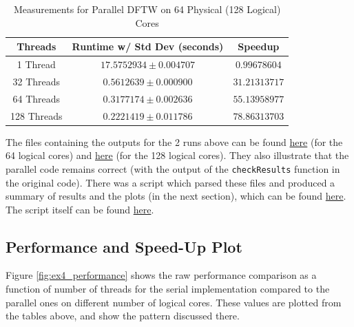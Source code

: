 \documentclass[a4paper,10pt]{article}
\begin{document}
\begin{table}[h!]
\centering
\begin{tabular}{|c|c|c|}
\hline
\textbf{Threads} & \textbf{Runtime w/ Std Dev (seconds)} & \textbf{Speedup} \\
\hline
1 Thread  & $17.5752934 \pm 0.004707$  & $0.99678604$ \\
32 Threads & $0.5612639 \pm 0.000900$ & $31.21313717$ \\
64 Threads & $0.3177174 \pm 0.002636$ & $55.13958977$ \\
128 Threads & $0.2221419 \pm 0.011786$ & $78.86313703$ \\
\hline
\end{tabular}
\caption{Measurements for Parallel DFTW on 64 Physical (128 Logical) Cores}
\label{table:ex4_128_cores}
\end{table}

The files containing the outputs for the 2 runs above can be found \href{https://github.com/paulmyr/DD2356-MethodsHPC/blob/master/3_open_mp/exercise4/outputs/dftw_omp_output_64.txt}{here} (for the 64 logical cores) and \href{https://github.com/paulmyr/DD2356-MethodsHPC/blob/master/3_open_mp/exercise4/outputs/dftw_omp_output_128.txt}{here} (for the 128 logical cores). They also illustrate that the parallel code remains correct (with the output of the \verb|checkResults| function in the original code). There was a script which parsed these files and produced a summary of results and the plots (in the next section), which can be found \href{https://github.com/paulmyr/DD2356-MethodsHPC/blob/master/3_open_mp/exercise4/outputs/plotting_script_output.txt}{here}. The script itself can be found \href{https://github.com/paulmyr/DD2356-MethodsHPC/blob/master/3_open_mp/exercise4/parse_output_and_plot.py}{here}.

\subsection{Performance and Speed-Up Plot}

Figure \ref{fig:ex4_performance} shows the raw performance comparison as a function of number of threads for the serial implementation compared to the parallel ones on different number of logical cores. These values are plotted from the tables above, and show the pattern discussed there.
\end{document}

